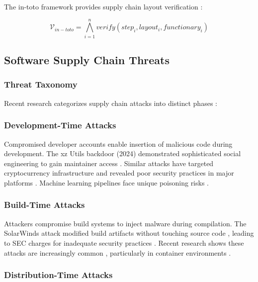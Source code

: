 \documentclass[11pt,a4paper]{article}
\begin{document}
The in-toto framework provides supply chain layout verification \cite{torres2019intoto}:

\begin{equation}
\mathcal{V}_{in-toto} = \bigwedge_{i=1}^{n} verify(step_i, layout_i, functionary_i)
\end{equation}

\subsection{Software Supply Chain Threats}

\subsubsection{Threat Taxonomy}

Recent research categorizes supply chain attacks into distinct phases \cite{ladisa2023taxonomy,vu2024supplychain}:

\subsubsection{Development-Time Attacks}

Compromised developer accounts enable insertion of malicious code during development. The xz Utils backdoor (2024) demonstrated sophisticated social engineering to gain maintainer access \cite{xz2024backdoor}. Similar attacks have targeted cryptocurrency infrastructure \cite{ronin2022hack} and revealed poor security practices in major platforms \cite{ftx2022collapse}. Machine learning pipelines face unique poisoning risks \cite{jiang2024llm,kumar2024mlops}.

\subsubsection{Build-Time Attacks}

Attackers compromise build systems to inject malware during compilation. The SolarWinds attack modified build artifacts without touching source code \cite{fireeye2020sunburst}, leading to SEC charges for inadequate security practices \cite{solarwinds2024sec}. Recent research shows these attacks are increasingly common \cite{vu2024supplychain}, particularly in container environments \cite{wang2023container}.

\subsubsection{Distribution-Time Attacks}
\end{document}
